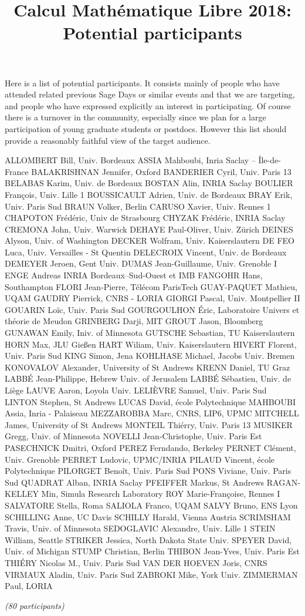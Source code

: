 \documentclass[12pt]{amsart}
\title{Calcul Mathématique Libre 2018:\\Potential participants}
\date{}
\begin{document}
\maketitle
\thispagestyle{empty}

Here is a list of potential participants. It consists mainly of people
who have attended related previous Sage Days or similar events and
that we are targeting, and people who have expressed explicitly an
interest in participating. Of course there is a turnover in the
community, especially since we plan for a large participation of young
graduate students or postdocs. However this list should provide a
reasonably faithful view of the target audience.

\bigskip

\obeylines
ALLOMBERT Bill, Univ. Bordeaux
ASSIA Mahboubi, Inria Saclay -- Île-de-France
BALAKRISHNAN Jennifer, Oxford
BANDERIER Cyril, Univ. Paris 13
BELABAS Karim, Univ. de Bordeaux
BOSTAN Alin, INRIA Saclay
BOULIER François, Univ. Lille 1
BOUSSICAULT Adrien, Univ. de Bordeaux
BRAY Erik, Univ. Paris Sud
BRAUN Volker, Berlin
CARUSO Xavier, Univ. Rennes 1
CHAPOTON Frédéric, Univ de Strasbourg
CHYZAK Frédéric, INRIA Saclay
CREMONA John, Univ. Warwick
DEHAYE Paul-Oliver, Univ. Zürich
DEINES Alyson, Univ. of Washington
DECKER Wolfram, Univ. Kaiserslautern
DE FEO Luca, Univ. Versailles - St Quentin
DELECROIX Vincent, Univ. de Bordeaux
DEMEYER Jeroen, Gent Univ.
DUMAS Jean-Guillaume, Univ. Grenoble I
ENGE Andreas INRIA Bordeaux–Sud-Ouest et IMB
FANGOHR Hans, Southampton
FLORI Jean-Pierre, Télécom ParisTech
GUAY-PAQUET Mathieu, UQAM
GAUDRY Pierrick, CNRS - LORIA
GIORGI Pascal, Univ. Montpellier II
GOUARIN Loïc, Univ. Paris Sud
GOURGOULHON Éric, Laboratoire Univers et théorie de Meudon
GRINBERG Darji, MIT
GROUT Jason, Bloomberg
GUNAWAN Emily, Iniv. of Minnesota
GUTSCHE Sebastian, TU Kaiserslautern
HORN Max, JLU Gießen
HART Wiliam, Univ. Kaiserslautern
HIVERT Florent, Univ. Paris Sud
KING Simon, Jena
KOHLHASE Michael, Jacobs Univ. Bremen
KONOVALOV Alexander, University of St Andrews
KRENN Daniel, TU Graz
LABBÉ Jean-Philippe, Hebrew Univ. of Jerusalem
LABBÉ Sébastien, Univ. de Liège
LAUVE Aaron, Loyola Univ.
LELIÈVRE Samuel, Univ. Paris Sud
LINTON Stephen, St Andrews
LUCAS David, école Polytechnique
MAHBOUBI Assia, Inria - Palaiseau
MEZZAROBBA Marc, CNRS, LIP6, UPMC
MITCHELL James, University of St Andrews
MONTEIL Thiérry, Univ. Paris 13
MUSIKER Gregg, Univ. of Minnesota
NOVELLI Jean-Christophe, Univ. Paris Est
PASECHNICK Dmitri, Oxford
PEREZ Ferndando, Berkeley
PERNET Clément, Univ. Grenoble
PERRET Ludovic, UPMC/INRIA
PILAUD Vincent, école Polytechnique
PILORGET Benoît, Univ. Paris Sud
PONS Viviane, Univ. Paris Sud
QUADRAT Alban, INRIA Saclay
PFEIFFER Markus, St Andrews
RAGAN-KELLEY Min, Simula Research Laboratory
ROY Marie-Françoise, Rennes I
SALVATORE Stella, Roma
SALIOLA Franco, UQAM
SALVY Bruno, ENS Lyon
SCHILLING Anne, UC Davis
SCHILLY Harald, Vienna Austria
SCRIMSHAM Travis, Univ. of Minnesota
SEDOGLAVIC Alexandre, Univ. Lille 1
STEIN William, Seattle
STRIKER Jessica, North Dakota State Univ.
SPEYER David, Univ. of Michigan
STUMP Christian, Berlin
THIBON Jean-Yves, Univ. Paris Est
THIÉRY Nicolas M., Univ. Paris Sud
VAN DER HOEVEN Joris, CNRS
VIRMAUX Aladin, Univ. Paris Sud
ZABROKI Mike, York Univ.
ZIMMERMAN Paul, LORIA

\medskip
\emph{(80 participants)}
\end{document}
